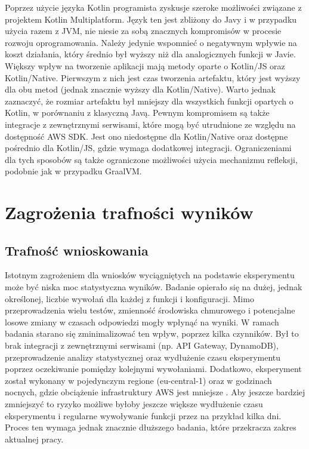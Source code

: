 Poprzez użycie języka Kotlin programista zyskusje szeroke możliwości związane z projektem Kotlin Multiplatform.
Język ten jest zbliżony do Javy i w przypadku użycia razem z JVM, nie niesie za sobą znacznych kompromisów w procesie rozwoju oprogramowania.
Należy jedynie wspomnieć o negatywnym wpływie na koszt działania, który średnio był wyższy niż dla analogicznych funkcji w Javie.
Większy wpływ na tworzenie aplikacji mają metody oparte o Kotlin/JS oraz Kotlin/Native.
Pierwszym z nich jest czas tworzenia artefaktu, który jest wyższy dla obu metod (jednak znacznie wyższy dla Kotlin/Native).
Warto jednak zaznaczyć, że rozmiar artefaktu był mniejszy dla wszystkich funkcji opartych o Kotlin, w porównaniu z klasyczną Javą.
Pewnym kompromisem są także integracje z zewnętrznymi serwisami, które mogą być utrudnione ze względu na dostępność AWS SDK.
Jest ono niedostępne dla Kotlin/Native oraz dostępne pośrednio dla Kotlin/JS, gdzie wymaga dodatkowej integracji.
Ograniczeniami dla tych sposobów są także ograniczone możliwości użycia mechanizmu refleksji, podobnie jak w przypadku GraalVM.

\section{Zagrożenia trafności wyników}\label{chapter:zagrozenia_trafnosci_wynikow}

\subsection*{Trafność wnioskowania}

Istotnym zagrożeniem dla wniosków wyciągniętych na podstawie eksperymentu może być niska moc statystyczna wyników. 
Badanie opierało się na dużej, jednak określonej, liczbie wywołań dla każdej z funkcji i konfiguracji. 
Mimo przeprowadzenia wielu testów, zmienność środowiska chmurowego i potencjalne losowe zmiany w czasach odpowiedzi mogły wpłynąć na wyniki. 
W ramach badania starano się zminimalizować ten wpływ, poprzez kilka czynników. 
Był to brak integracji z zewnętrznymi serwisami (np. API Gateway, DynamoDB), przeprowadzenie analizy statystycznej oraz wydłużenie czasu eksperymentu poprzez oczekiwanie pomiędzy kolejnymi wywołaniami.
Dodatkowo, eksperyment został wykonany w pojedynczym regione (eu-central-1) oraz w godzinach nocnych, gdzie obciążenie infrastruktury AWS jest mniejsze \cite{10.1145/3491204.3543506}.
Aby jeszcze bardziej zmniejszyć to ryzyko możliwe byłoby jeszcze większe wydłużenie czasu eksperymentu i regularne wywoływanie funkcji przez na przykład kilka dni.
Proces ten wymaga jednak znacznie dłuższego badania, które przekracza zakres aktualnej pracy.

